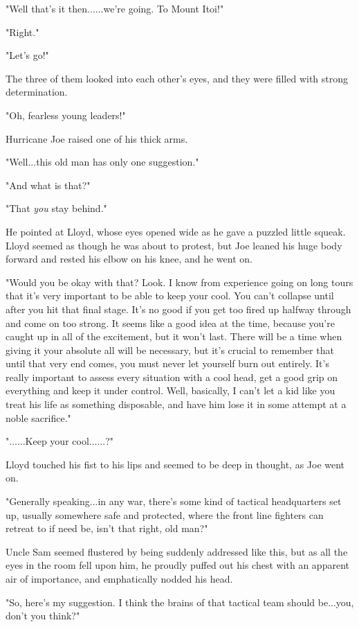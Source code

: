 \documentclass[
]{article}
\begin{document}
"Well that's it then......we're going. To Mount Itoi!"

"Right."

"Let's go!"

The three of them looked into each other's eyes, and they were filled
with strong determination.

"Oh, fearless young leaders!"

Hurricane Joe raised one of his thick arms.

"Well...this old man has only one suggestion."

"And what is that?"

"That \emph{you} stay behind."

He pointed at Lloyd, whose eyes opened wide as he gave a puzzled little
squeak. Lloyd seemed as though he was about to protest, but Joe leaned
his huge body forward and rested his elbow on his knee, and he went on.

"Would you be okay with that? Look. I know from experience going on long
tours that it's very important to be able to keep your cool. You can't
collapse until after you hit that final stage. It's no good if you get
too fired up halfway through and come on too strong. It seems like a
good idea at the time, because you're caught up in all of the
excitement, but it won't last. There will be a time when giving it your
absolute all will be necessary, but it's crucial to remember that until
that very end comes, you must never let yourself burn out entirely. It's
really important to assess every situation with a cool head, get a good
grip on everything and keep it under control. Well, basically, I can't
let a kid like you treat his life as something disposable, and have him
lose it in some attempt at a noble sacrifice."

"......Keep your cool......?"

Lloyd touched his fist to his lips and seemed to be deep in thought, as
Joe went on.

"Generally speaking...in any war, there's some kind of tactical
headquarters set up, usually somewhere safe and protected, where the
front line fighters can retreat to if need be, isn't that right, old
man?"

Uncle Sam seemed flustered by being suddenly addressed like this, but as
all the eyes in the room fell upon him, he proudly puffed out his chest
with an apparent air of importance, and emphatically nodded his head.

"So, here's my suggestion. I think the brains of that tactical team
should be...you, don't you think?"
\end{document}
